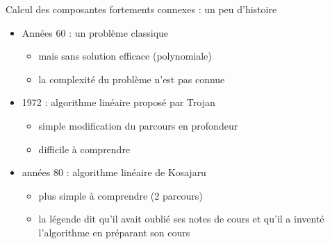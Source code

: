 
\begin{frame}{Calcul des composantes fortements connexes : un peu d'histoire}

\begin{itemize}
    \item Années 60 : un problème classique 
    \begin{itemize}
        \item mais sans solution efficace (polynomiale)
        \item la complexité du problème n'est pas connue 
    \end{itemize}
    \item 1972 : algorithme linéaire proposé par Trojan 
    \begin{itemize}
        \item simple modification du parcours en profondeur 
        \item difficile à comprendre 
    \end{itemize}
    \item années 80 : algorithme linéaire de Kosajaru 
    \begin{itemize}
        \item plus simple à comprendre (2 parcours)
        \item la légende dit qu'il avait oublié ses notes de cours et qu'il a inventé l'algorithme en préparant son cours 
    \end{itemize}
\end{itemize}
\end{frame}


